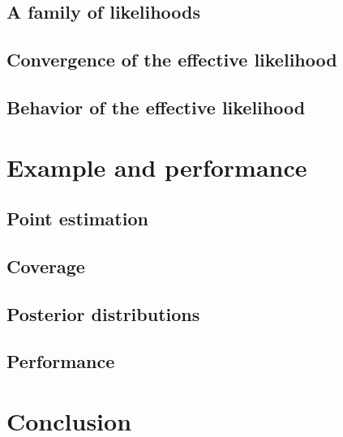 \subsection{A family of likelihoods\label{sec:priors}}


\subsection{Convergence of the effective likelihood\label{sec:llhconvergence}}


\subsection{Behavior of the effective likelihood\label{sec:llhbehavior}}


\section{Example and performance\label{sec:example}}


\subsection{Point estimation\label{sec:pointestimation}}


\subsection{Coverage\label{sec:coverage}}


\subsection{Posterior distributions\label{sec:posterior}}


\subsection{Performance\label{sec:performance}}


\section{Conclusion\label{sec:conclusion}}


